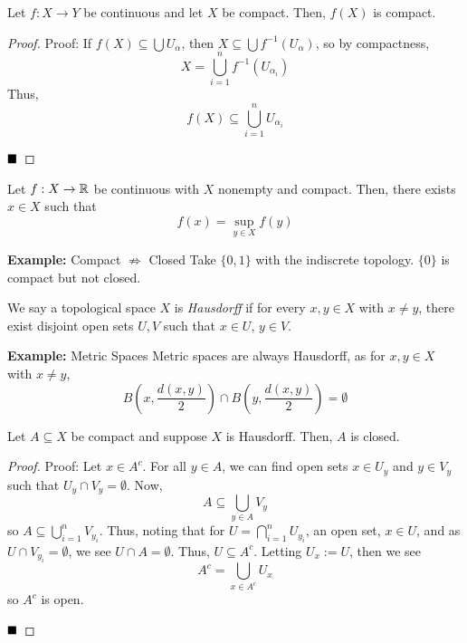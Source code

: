 
\begin{lemma}
    Let $f : X \to Y$ be continuous and let $X$ be compact. Then, $f(X)$ is compact.
\end{lemma}
\begin{proof}{Proof:}
    If $f(X) \subseteq \bigcup U_{\alpha}$, then $X \subseteq \bigcup f^{-1}(U_{\alpha})$, so by compactness,
    \[ X = \bigcup_{i = 1}^{n} f^{-1}(U_{\alpha_i}) \]
    Thus,
    \[ f(X) \subseteq \bigcup_{i = 1}^{n} U_{\alpha_i} \]

    $\qed$
\end{proof}

\begin{lemma}
    Let $f : X \to \mathbb{R}$ be continuous with $X$ nonempty and compact. Then, there exists $x \in X$ such that
    \[ f(x) = \sup_{y \in X} f(y) \]
\end{lemma}

\begin{example}{\textbf{Example:} Compact $\not\Rightarrow$ Closed}
    Take $\{0, 1\}$ with the indiscrete topology. $\{0\}$ is compact but not closed.
\end{example}

\begin{definition}
    We say a topological space $X$ is \emph{Hausdorff} if for every $x, y \in X$ with $x \neq y$, there exist disjoint open sets $U, V$ such that $x \in U$, $y \in V$.
\end{definition}

\begin{example}{\textbf{Example:} Metric Spaces}
    Metric spaces are always Hausdorff, as for $x, y \in X$ with $x \ne y$,
    \[ B\left(x, \frac{d(x, y)}{2}\right) \cap B\left(y, \frac{d(x, y)}{2}\right) = \emptyset \]
\end{example}

\begin{lemma}
    Let $A \subseteq X$ be compact and suppose $X$ is Hausdorff. Then, $A$ is closed.
\end{lemma}
\begin{proof}{Proof:}
    Let $x \in A^{c}$. For all $y \in A$, we can find open sets $x \in U_y$ and $y \in V_y$ such that $U_y \cap V_y = \emptyset$. Now,
    \[ A \subseteq \bigcup_{y \in A} V_y \]
    so $A \subseteq \bigcup_{i = 1}^{n} V_{y_i}$. Thus, noting that for $U = \bigcap_{i = 1}^{n} U_{y_i}$, an open set, $x \in U$, and as $U \cap V_{y_i} = \emptyset$, we see $U \cap A = \emptyset$. Thus, $U \subseteq A^{c}$. Letting $U_x := U$, then we see
    \[ A^{c} = \bigcup_{x \in A^{c}} U_x \]
    so $A^{c}$ is open.

    $\qed$
\end{proof}

